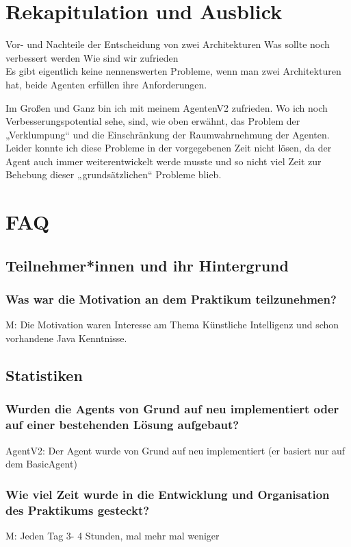 \documentclass[runningheads]{llncs}
\begin{document}
\section{Rekapitulation und Ausblick}
Vor- und Nachteile der Entscheidung von zwei Architekturen
Was sollte noch verbessert werden
Wie sind wir zufrieden\\

Es gibt eigentlich keine nennenswerten Probleme, wenn man zwei Architekturen hat, beide Agenten erfüllen ihre Anforderungen. 

Im Großen und Ganz bin ich mit meinem AgentenV2 zufrieden. Wo ich noch Verbesserungspotential sehe, sind, wie oben erwähnt, das Problem der „Verklumpung“ und die Einschränkung der Raumwahrnehmung der Agenten. Leider konnte ich diese Probleme in der vorgegebenen Zeit nicht lösen, da der Agent auch immer weiterentwickelt werde musste und so nicht viel Zeit zur Behebung dieser „grundsätzlichen“ Probleme blieb.

\section{FAQ}
\subsection{Teilnehmer*innen und ihr Hintergrund}
\subsubsection{Was war die Motivation an dem Praktikum teilzunehmen?\\}
M: Die Motivation waren Interesse am Thema Künstliche Intelligenz und schon vorhandene Java Kenntnisse.
\subsection{Statistiken}
\subsubsection{Wurden die Agents von Grund auf neu implementiert oder auf einer bestehenden Lösung aufgebaut?\\}
AgentV2: Der Agent wurde von Grund auf neu implementiert (er basiert nur auf dem BasicAgent)
\subsubsection{Wie viel Zeit wurde in die Entwicklung und Organisation des Praktikums gesteckt?\\}
M: Jeden Tag 3- 4 Stunden, mal mehr mal weniger
\end{document}

